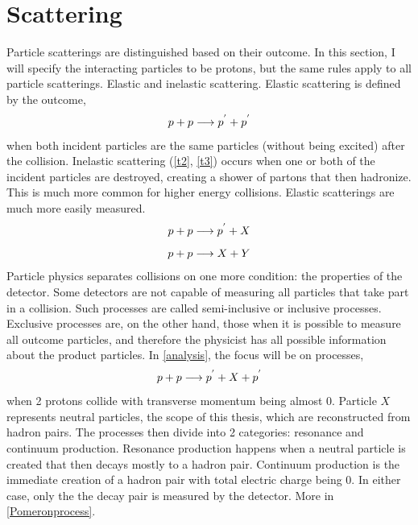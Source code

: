\section{Scattering}
Particle scatterings are distinguished based on their outcome. In this section, I will specify the interacting particles to be protons, but the same rules apply to all particle scatterings. Elastic and inelastic scattering. Elastic scattering is defined by the outcome,
\begin{equation}
\centering
p + p \longrightarrow p^{'} + p^{'}
\label{t1}
\end{equation}
when both incident particles are the same particles (without being excited) after the collision. Inelastic scattering (\autoref{t2}, \autoref{t3}) occurs when one or both of the incident particles are destroyed, creating a shower of partons that then hadronize. This is much more common for higher energy collisions. Elastic scatterings are much more easily measured.
\begin{equation}
\centering
p + p \longrightarrow p^{'} + X
\label{t2}
\end{equation}
\begin{equation}
\centering
p + p \longrightarrow X + Y
\label{t3}
\end{equation}
Particle physics separates collisions on one more condition: the properties of the detector. Some detectors are not capable of measuring all particles that take part in a collision. Such processes are called semi-inclusive or inclusive processes. Exclusive processes are, on the other hand, those when it is possible to measure all outcome particles, and therefore the physicist has all possible information about the product particles. In \autoref{analysis}, the focus will be on processes,
\begin{equation}
\centering
p + p \longrightarrow p^{'} + X + p^{'}
\label{t26}
\end{equation}
when 2 protons collide with transverse momentum being almost 0. Particle $X$ represents neutral particles, the scope of this thesis, which are reconstructed from hadron pairs. The processes then divide into 2 categories: resonance and continuum production. Resonance production happens when a neutral particle is created that then decays mostly to a hadron pair. Continuum production is the immediate creation of a hadron pair with total electric charge being 0. In either case, only the the decay pair is measured by the detector. More in \autoref{Pomeronprocess}. 



